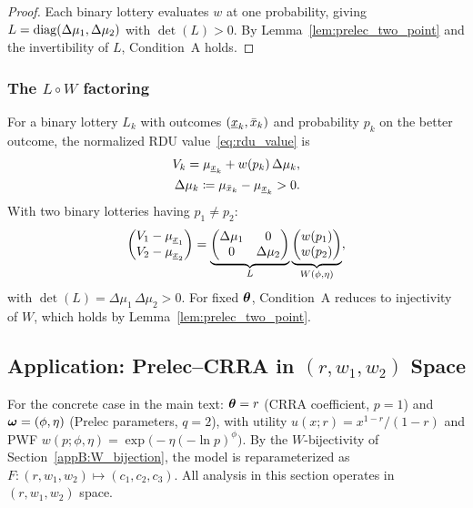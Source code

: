 \begin{proof}
Each binary lottery evaluates $w$ at one probability, giving
$L = \operatorname{diag}(\Delta\mu_1, \Delta\mu_2)$ with $\det(L) > 0$.
By Lemma~\ref{lem:prelec_two_point} and the invertibility of $L$,
Condition~A holds.
\end{proof}

\subsubsection{The $L \circ W$ factoring}
\label{appB:same_cdf}

For a binary lottery $L_k$ with outcomes $(\underline{x}_k, \bar{x}_k)$
and probability $p_k$ on the better outcome, the normalized RDU
value~\eqref{eq:rdu_value} is
\begin{equation}\label{eq:binary_rdu}
  \begin{aligned}
    V_k = \mu_{\underline{x}_k} + w(p_k)\,\Delta\mu_k,
    \\
    \Delta\mu_k \coloneqq \mu_{\bar{x}_k} - \mu_{\underline{x}_k} > 0.
  \end{aligned}
\end{equation}
With two binary lotteries having $p_1 \neq p_2$:
\begin{equation}
    \begin{pmatrix} V_1 - \mu_{\underline{x}_1} \\ V_2 - \mu_{\underline{x}_2} \end{pmatrix}
    = \underbrace{
      \begin{pmatrix} \Delta\mu_1 & 0 \\ 0 & \Delta\mu_2 \end{pmatrix}
    }_{L}
    \underbrace{
      \begin{pmatrix} w(p_1) \\ w(p_2) \end{pmatrix}
    }_{W(\phi, \eta)},
    \label{eq:factoring_binary}
\end{equation}
with $\det(L) = \Delta\mu_1\,\Delta\mu_2 > 0$. For fixed
$\boldsymbol{\theta}$, Condition~A reduces to injectivity of $W$, which holds
by Lemma~\ref{lem:prelec_two_point}.


\subsection{Application: Prelec--CRRA in $(r, w_1, w_2)$ Space}
\label{appB:prelec_crra}

For the concrete case in the main text:
$\boldsymbol{\theta} = r$ (CRRA coefficient, $p = 1$) and
$\boldsymbol{\omega} = (\phi, \eta)$ (Prelec parameters, $q = 2$), with utility
$u(x; r) = x^{1-r}/(1-r)$ and PWF
$w(p; \phi, \eta) = \exp\bigl(-\eta(-\ln p)^\phi\bigr)$.
By the $W$-bijectivity of Section~\ref{appB:W_bijection}, the model is
reparameterized as $F \colon (r, w_1, w_2) \mapsto (c_1, c_2, c_3)$.
All analysis in this section operates in $(r, w_1, w_2)$ space.


